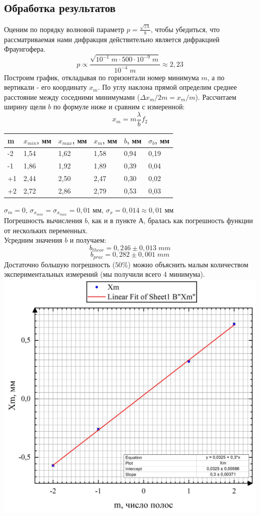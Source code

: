 \documentclass[a4paper]{article}
\begin{document}
\subsection*{Обработка результатов}
Оценим по порядку волновой параметр $p = \frac{\sqrt{z \lambda}}{b}$, чтобы убедиться, что рассматриваемая нами дифракция действительно является дифракцией Фраунгофера.\\
$$ p \propto \frac{\sqrt{10^{-1} \; m \cdot 500 \cdot 10^{-9}\; m}}{10^{-4} \; m} \approx 2,23$$
Построим график, откладывая по горизонтали номер минимума $m$, а по вертикали - его координату $x_m$. По углу наклона прямой определим среднее расстояние между соседними минимумами ($\Delta x_m/2m = x_m/m$). Рассчитаем ширину щели $b$ по формуле ниже и сравним с измеренной:
$$x_m = m\frac{\lambda}{b}f_2$$
\begin{center}
\begin{tabular}{|l|l|l|l|l|l|}
\hline
m & $x_{min}$, мм & $x_{max}$, мм & $x_m$, мм & $b$, мм & $\sigma_b$, мм\\
\hline
-2 &1,54 & 1,62 & 1,58 & 0,94 & 0,19\\
\hline
-1 & 1,86 & 1,92 & 1,89 & 0,39 & 0,04\\
\hline
+1 & 2,44 & 2,50 & 2,47 & 0,30 &0,02 \\
\hline
+2 & 2,72 & 2,86 & 2,79 & 0,53 & 0,03\\
\hline
\end{tabular}
\end{center}
$\sigma_m = 0$, $\sigma_{x_{min}} = \sigma_{x_{max}} = 0,01$ мм, $\sigma_x = 0,014 \approx 0,01$ мм\\
Погрешность вычисления $b$, как и в пункте А, бралась как погрешность функции от нескольких переменных. \\
Усредним значения $b$ и получаем:
$$b_{theor} = 0,246 \pm 0,013 \; mm$$
$$b_{prac} = 0,282 \pm 0,001 \; mm$$
Достаточно большую погрешность ($50 \%$) можно объяснить малым количеством экспериментальных измерений (мы получили всего 4 минимума).\\
\includegraphics[width=18cm]{b2}\\
\end{document}
